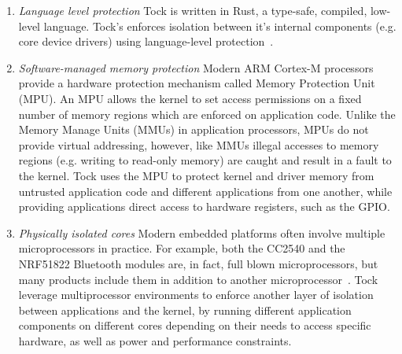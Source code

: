 \begin{enumerate}
  \item \emph{Language level protection} Tock is written in Rust, a type-safe,
  compiled, low-level language. Tock's enforces isolation between it's
  internal components (e.g. core device drivers) using language-level
  protection~.
  
  \item \emph{Software-managed memory protection} Modern ARM Cortex-M
  processors provide a hardware protection mechanism called Memory Protection
  Unit (MPU).  An MPU allows the kernel to set access permissions on a fixed
  number of memory regions which are enforced on application code. Unlike the
  Memory Manage Units (MMUs) in application processors, MPUs do not provide
  virtual addressing, however, like MMUs illegal accesses to memory regions
  (e.g. writing to read-only memory) are caught and result in a fault to the
  kernel. Tock uses the MPU to protect kernel and driver memory from untrusted
  application code and different applications from one another, while
  providing applications direct access to hardware registers, such as the
  GPIO.

  \item \emph{Physically isolated cores} Modern embedded platforms often
  involve multiple microprocessors in practice. For example, both the CC2540
  and the NRF51822 Bluetooth modules are, in fact, full blown microprocessors,
  but many products include them in addition to another
  microprocessor~. Tock leverage
  multiprocessor environments to enforce another layer of isolation between
  applications and the kernel, by running different application components on
  different cores depending on their needs to access specific hardware, as
  well as power and performance constraints.

\end{enumerate}

